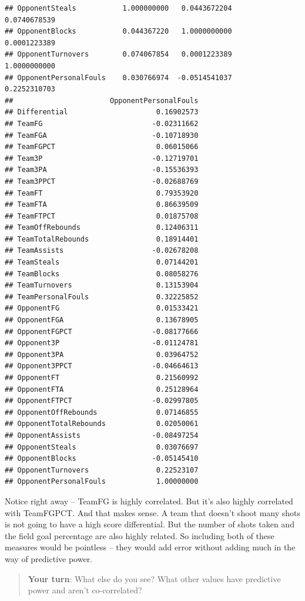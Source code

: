 \documentclass[
]{book}
\begin{document}
\begin{verbatim}
## OpponentSteals           1.000000000   0.0443672204      0.0740678539
## OpponentBlocks           0.044367220   1.0000000000      0.0001223389
## OpponentTurnovers        0.074067854   0.0001223389      1.0000000000
## OpponentPersonalFouls    0.030766974  -0.0514541037      0.2252310703
##                       OpponentPersonalFouls
## Differential                     0.16902573
## TeamFG                          -0.02311662
## TeamFGA                         -0.10718930
## TeamFGPCT                        0.06015066
## Team3P                          -0.12719701
## Team3PA                         -0.15536393
## Team3PPCT                       -0.02688769
## TeamFT                           0.79353920
## TeamFTA                          0.86639509
## TeamFTPCT                        0.01875708
## TeamOffRebounds                  0.12406311
## TeamTotalRebounds                0.18914401
## TeamAssists                     -0.02678208
## TeamSteals                       0.07144201
## TeamBlocks                       0.08058276
## TeamTurnovers                    0.13153904
## TeamPersonalFouls                0.32225852
## OpponentFG                       0.01533421
## OpponentFGA                      0.13678905
## OpponentFGPCT                   -0.08177666
## Opponent3P                      -0.01124781
## Opponent3PA                      0.03964752
## Opponent3PPCT                   -0.04664613
## OpponentFT                       0.21560992
## OpponentFTA                      0.25128964
## OpponentFTPCT                   -0.02997805
## OpponentOffRebounds              0.07146855
## OpponentTotalRebounds            0.02050061
## OpponentAssists                 -0.08497254
## OpponentSteals                   0.03076697
## OpponentBlocks                  -0.05145410
## OpponentTurnovers                0.22523107
## OpponentPersonalFouls            1.00000000
\end{verbatim}

Notice right away -- TeamFG is highly correlated. But it's also highly correlated with TeamFGPCT. And that makes sense. A team that doesn't shoot many shots is not going to have a high score differential. But the number of shots taken and the field goal percentage are also highly related. So including both of these measures would be pointless -- they would add error without adding much in the way of predictive power.

\begin{quote}
\textbf{Your turn}: What else do you see? What other values have predictive power and aren't co-correlated?
\end{quote}
\end{document}
